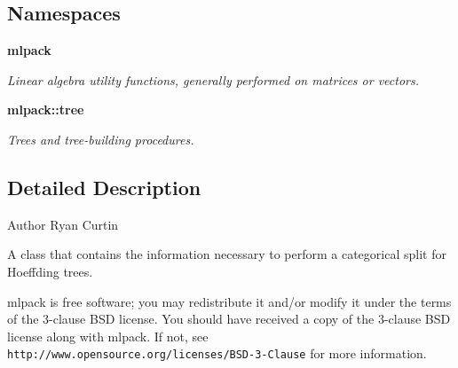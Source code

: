 \subsection*{Namespaces}
\begin{DoxyCompactItemize}
\item 
 {\bf mlpack}
\begin{DoxyCompactList}\small\item\em Linear algebra utility functions, generally performed on matrices or vectors. \end{DoxyCompactList}\item 
 {\bf mlpack\+::tree}
\begin{DoxyCompactList}\small\item\em Trees and tree-\/building procedures. \end{DoxyCompactList}\end{DoxyCompactItemize}


\subsection{Detailed Description}
\begin{DoxyAuthor}{Author}
Ryan Curtin
\end{DoxyAuthor}
A class that contains the information necessary to perform a categorical split for Hoeffding trees.

mlpack is free software; you may redistribute it and/or modify it under the terms of the 3-\/clause B\+SD license. You should have received a copy of the 3-\/clause B\+SD license along with mlpack. If not, see {\tt http\+://www.\+opensource.\+org/licenses/\+B\+S\+D-\/3-\/\+Clause} for more information. 